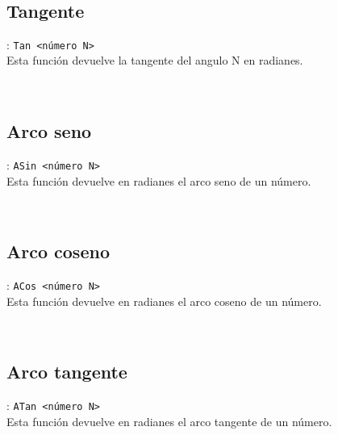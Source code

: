       \begin{fxcode}
         \\
      \end{fxcode}
      
      \subsection*{Tangente}: \texttt{Tan <número N>}\\
      Esta función devuelve la tangente del angulo N en radianes.
      
      \begin{fxcode}
         \\
      \end{fxcode}
      
      \subsection*{Arco seno}: \texttt{ASin <número N>}\\
      Esta función devuelve en radianes el arco seno de un número.
      
      \begin{fxcode}
         \\
      \end{fxcode}
      
      \subsection*{Arco coseno}: \texttt{ACos <número N>}\\
      Esta función devuelve en radianes el arco coseno de un número.
      
      \begin{fxcode}
         \\
      \end{fxcode}
      
      \subsection*{Arco tangente}: \texttt{ATan <número N>}\\
      Esta función devuelve en radianes el arco tangente de un número.
      
